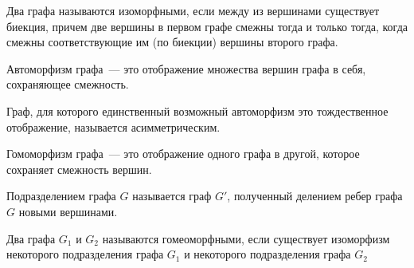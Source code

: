 
\begin{definition}
  Два графа называются изоморфными, если между из вершинами существует биекция,
  причем две вершины в первом графе смежны тогда и только тогда, когда смежны
  соответствующие им (по биекции) вершины второго графа.
\end{definition}

\begin{definition}
  Автоморфизм графа~--- это отображение множества вершин графа в себя,
  сохраняющее смежность.
\end{definition}

\begin{remark}
  Граф, для которого единственный возможный автоморфизм это тождественное
  отображение, называется асимметрическим.
\end{remark}

\begin{definition}
  Гомоморфизм графа~--- это отображение одного графа в другой, которое сохраняет
  смежность вершин.
\end{definition}

\begin{definition}
  Подразделением графа \(G\) называется граф \(G'\), полученный делением ребер
  графа \(G\) новыми вершинами.
\end{definition}

\begin{definition}
  Два графа \(G_{1}\) и \(G_{2}\) называются гомеоморфными, если существует
  изоморфизм некоторого подразделения графа \(G_{1}\) и некоторого подразделения
  графа \(G_{2}\)
\end{definition}
